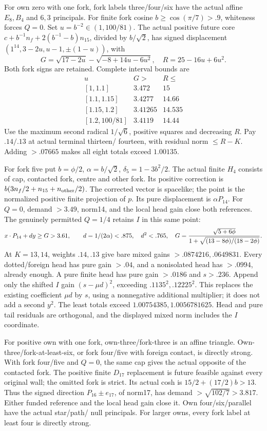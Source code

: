 \documentclass[11pt]{article}
\theoremstyle{definition}
\theoremstyle{remark}
\begin{document}
For own zero with one fork, fork labels three/four/six have the
actual affine \(E_8,B_4\) and \(6,3\) principals. For finite
fork cosine \(b\ge\cos(\pi/7)>.9\), whiteness forces \(Q=0\).
Set \(u=b^{-2}\in(1,100/81)\). The actual positive future core
\(c+b^{-1}n_f+2(b^{-1}-b)n_{15}\), divided by \(b/\sqrt2\),
has signed displacement \((1^{14},3-2u,u-1,\pm(1-u))\), with
\[
 G=\sqrt{17-2u}-\sqrt{-8+14u-6u^2},\quad R=25-16u+6u^2.
\]
Both fork signs are retained. Complete interval bounds are
\[
\begin{array}{c|c|c}
u&G>&R\le\\\hline
{}[1,1.1]&3.472&15\\{}[1.1,1.15]&3.4277&14.66\\
{}[1.15,1.2]&3.41265&14.535\\{}[1.2,100/81]&3.4119&14.44
\end{array}
\]
Use the maximum second radical \(1/\sqrt6\), positive squares and
decreasing \(R\). Pay \(.14/.13\) at actual terminal thirteen/
fourteen, with residual norm \(\le R-K\). Adding \(>.07665\)
makes all eight totals exceed \(1.00135\).

For fork five put \(b=\phi/2\), \(\alpha=b/\sqrt2\),
\(\delta_5=1-3b^2/2\). The actual finite \(H_4\) consists of cap,
contacted fork, centre and other fork. Its positive correction is
\(b(3n_f/2+n_{15}+n_{\rm other}/2)\). The corrected vector is
spacelike; the point is the normalized positive finite projection
of \(p\). Its pure displacement is \(\alpha P_{14}\).
For \(Q=0\), demand \(>3.49\), norm14, and the local head gain
close both references. The genuinely permitted \(Q=1/4\) retains
\(I\) in this same point:
\[
 x\cdot P_{14}+dy\ge G>3.61,\qquad
 d=1/(2\alpha)<.875,\quad d^2<.765,
 \quad G={\sqrt{5+6\phi}\over1+\sqrt{(13-8\phi)/(18-2\phi)}}.
\]
At \(K=13,14\), weights \(.14,.13\) give bare mixed gains
\(>.0874216,.0649831\). Every dotted/foreign head has pure gain
\(>.04\), and a nonisolated head has \(>.0994\), already enough.
A pure finite head has pure gain \(>.0186\) and \(s>.236\).
Append only the shifted \(I\) gain \((s-\mu d)^2\), exceeding
\(.1135^2,.12225^2\). This replaces the existing coefficient
\(\mu d\) by \(s\), using a nonnegative additional multiplier;
it does not add a second \(y^2\). The least totals exceed
\(1.00754385,1.0056781625\). Head and pure tail residuals are
orthogonal, and the displayed mixed norm includes the \(I\) coordinate.

For positive own with one fork, own-three/fork-three is an affine
triangle. Own-three/fork-at-least-six, or fork four/five with foreign
contact, is directly strong. With fork four/five and \(Q=0\), the
same cap gives the actual opposite of the contacted fork. The positive
finite \(D_{17}\) replacement is future feasible against every
original wall; the omitted fork is strict. Its actual cosh is
\(15/2+(17/2)b>13\). Thus the signed direction
\(P_{16}\pm e_{17}\), of norm17, has demand
\(>\sqrt{102/7}>3.817\). Either funded reference and the local
head gain close it. Own four/six/parallel have the actual star/path/
null principals. For larger owns, every fork label at least four is
directly strong.
\end{document}
